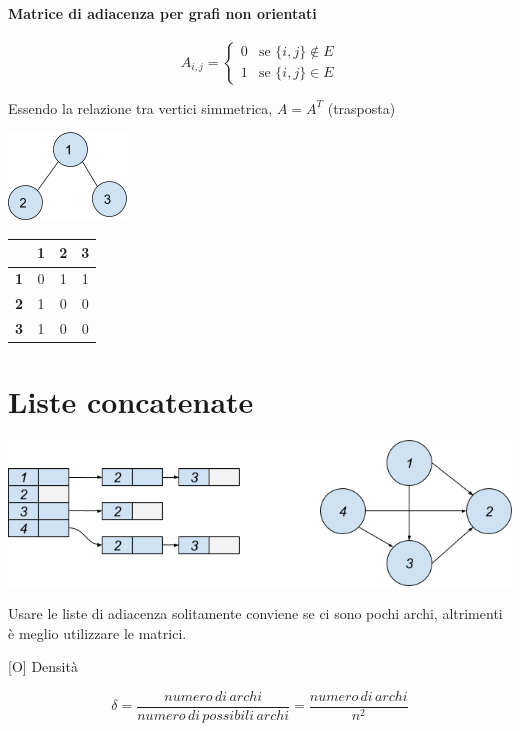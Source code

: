 \paragraph{Matrice di adiacenza per grafi non orientati}

\begin{equation}
A_{i,j} = 
\begin{cases}
0 & \mbox{se } \{i,j\} \notin E \\ 
1 & \mbox{se } \{i,j\} \in E
\end{cases}
\end{equation}

{Essendo la relazione tra vertici simmetrica, $A=A^T$ (trasposta)}

{\includegraphics{images/image535.png}}

\begin{tabular}{|c|c|c|c|}
\hline 
  & \textbf{1} & \textbf{2} & \textbf{3} \\ 
\hline 
\textbf{1} & 0 & 1 & 1 \\ 
\hline 
\textbf{2} & 1 & 0 & 0 \\ 
\hline 
\textbf{3} & 1 & 0 & 0 \\ 
\hline 
\end{tabular} 

\section{Liste concatenate}

{\includegraphics{images/image537.png}}

{Usare le liste di adiacenza solitamente conviene se ci sono pochi archi, altrimenti è meglio utilizzare le matrici.}

{{[}O{]} Densità}

\begin{equation}
\delta=\frac{numero\,di\,archi}{numero\,di\,possibili\,archi} = \frac{numero\,di\,archi}{n^2}
\end{equation}

